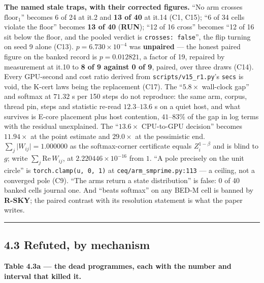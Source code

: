 \documentclass[11pt,a4paper]{article}
\theoremstyle{plain}
\theoremstyle{definition}
\theoremstyle{remark}
\begin{document}
\textbf{The named stale traps, with their corrected figures.} ``No arm
crosses \(\mathrm{floor}_1\)'' becomes 6 of 24 at it.2 and \textbf{13 of
40} at it.14 (C1, C15); ``6 of 34 cells violate the floor'' becomes
\textbf{13 of 40} (\textbf{RUN}); ``12 of 16 cross'' becomes ``12 of 16
sit below the floor, and the pooled verdict is
\texttt{crosses:\ false}'', the flip turning on seed 9 alone (C13).
\(p=6.730\times10^{-4}\) was \textbf{unpaired} --- the honest paired
figure on the banked record is \(p=0.012821\), a factor of 19, repaired
by measurement at it.10 to \textbf{8 of 9 against 0 of 9}, paired, over
three draws (C14). Every GPU-second and cost ratio derived from
\texttt{scripts/v15\_r1.py}'s \texttt{secs} is void, the K-cert laws
being the replacement (C17). The ``\(5.8\times\) wall-clock gap'' and
softmax at \(71.32\) s per 150 steps do not reproduce: the same arm,
corpus, thread pin, steps and statistic re-read \(12.3\)--\(13.6\) s on
a quiet host, and what survives is E-core placement plus host
contention, \(41\)--\(83\%\) of the gap in log terms with the residual
unexplained. The ``\(13.6\times\) CPU-to-GPU decision'' becomes
\(11.94\times\) at the point estimate and \(29.0\times\) at the
pessimistic end. \(\sum_j\lvert W_{ij}\rvert=1.000000\) as the
softmax-corner certificate equals \(Z_i^{1-\beta}\) and is blind to
\(g\); write \(\sum_j\mathrm{Re}\,W_{ij}\), at
\(2.220446\times10^{-16}\) from \(1\). ``A pole precisely on the unit
circle'' is \texttt{torch.clamp(u,\ 0,\ 1)} at
\texttt{ceq/arm\_smprime.py:113} --- a ceiling, not a converged pole
(C9). ``The arms return a state distribution'' is false: 0 of 40 banked
cells journal one. And ``beats softmax'' on any BED-M cell is banned by
\textbf{R-SKY}; the paired contrast with its resolution statement is
what the paper writes.

\begin{center}\rule{0.5\linewidth}{0.5pt}\end{center}

\subsection{4.3 Refuted, by mechanism}\label{refuted-by-mechanism}

\textbf{Table 4.3a --- the dead programmes, each with the number and
interval that killed it.}
\end{document}
